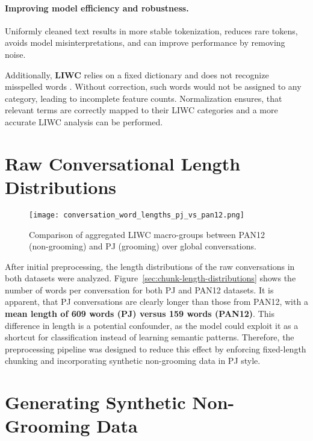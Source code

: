 \paragraph{Improving model efficiency and robustness.}  
Uniformly cleaned text results in more stable tokenization, reduces rare tokens, avoids model misinterpretations, and can improve performance by removing noise. \cite{sun-etal-2023-tokenization}

Additionally, \textbf{LIWC} relies on a fixed dictionary and does not recognize misspelled words \cite{pennebaker2022liwc}. Without correction, such words would not be assigned to any category, leading to incomplete feature counts. Normalization ensures, that relevant terms are correctly mapped to their LIWC categories and a more accurate LIWC analysis can be performed.

\section{Raw Conversational Length Distributions }

\begin{figure}[H]
    \centering
    \texttt{[image: conversation\_word\_lengths\_pj\_vs\_pan12.png]}
    \caption[Comparison of LIWC macro-groups]{Comparison of aggregated LIWC macro-groups between PAN12 (non-grooming) and PJ (grooming) over global conversations.}
    \label{fig:conversation_word_lengths}
\end{figure}

After initial preprocessing, the length distributions of the raw conversations in both datasets were analyzed. Figure~\ref{sec:chunk-length-distributions} shows the number of words per conversation for both PJ and PAN12 datasets. It is apparent, that PJ conversations are clearly longer than those from PAN12, with a \textbf{mean length of 609 words (PJ) versus 159 words (PAN12)}. This difference in length is a potential confounder, as the model could exploit it as a shortcut for classification instead of learning semantic patterns. Therefore, the preprocessing pipeline was designed to reduce this effect by enforcing fixed-length chunking and incorporating synthetic non-grooming data in PJ style.


\section{Generating Synthetic Non-Grooming Data}\label{sec:synthetic-data}

